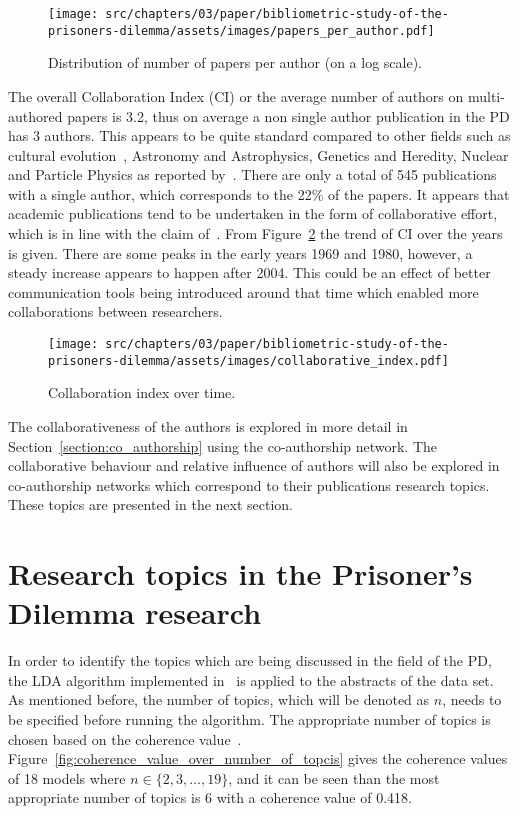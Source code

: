 \begin{figure}[!hbtp]
    \centering
    \texttt{[image: src/chapters/03/paper/bibliometric-study-of-the-prisoners-dilemma/assets/images/papers\_per\_author.pdf]}
    \caption{Distribution of number of papers per author (on a log scale).}
    \label{fig:num_papers_per_author}
\end{figure}

The overall Collaboration Index (CI) or the average number of authors on
multi-authored papers is 3.2, thus on average a non single author publication in
the PD has 3 authors. This appears to be quite standard compared to other fields
such as cultural evolution~\cite{youngblood2018}, Astronomy and Astrophysics,
Genetics and Heredity, Nuclear and Particle Physics as reported
by~\cite{nature_author_blog}.
There are only a total of 545 publications with a single author, which
corresponds to the 22\% of the papers. It appears that academic publications
tend to be undertaken in the form of collaborative effort, which is in line
with the claim of~\cite{Kyvik2017}. From
Figure~\ref{fig:ci_over_time} the trend of CI over the years is given. There are
some peaks in the early years 1969 and 1980, however, a steady increase appears
to happen after 2004. This could be an effect of better communication tools
being introduced around that time which enabled more collaborations between
researchers.

\begin{figure}[!hbtp]
    \centering
    \texttt{[image: src/chapters/03/paper/bibliometric-study-of-the-prisoners-dilemma/assets/images/collaborative\_index.pdf]}
    \caption{Collaboration index over time.}\label{fig:ci_over_time}
\end{figure}

The collaborativeness of the authors is explored in more detail in
Section~\ref{section:co_authorship} using the co-authorship network. The
collaborative behaviour and relative influence of authors will also be explored
in co-authorship networks which correspond to their publications research topics.
These topics are presented in the next section.

\section{Research topics in the Prisoner's Dilemma research}\label{section:topics}

In order to identify the topics which are being discussed in the field of the
PD, the LDA algorithm implemented in~\cite{rehurek_lrec} is applied to the
abstracts of the data set. As mentioned before, the number of topics, which
will be denoted as \(n\), needs to be specified before running the algorithm.
The appropriate number of topics is chosen based on the coherence
value~\cite{Roder2015}. Figure~\ref{fig:coherence_value_over_number_of_topcis}
gives the coherence values of 18 models where \(n \in \{2, 3, \dots, 19\}\), and
it can be seen than the most appropriate number of topics is 6 with a coherence
value of 0.418.

